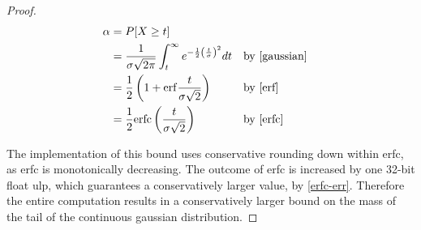 \documentclass{article}
\begin{document}
\begin{proof}
    \begin{align*}
        \alpha &= P[X \ge t] \\
        &= \frac{1}{\sigma \sqrt{2 \pi}} \int_{t}^{\infty} e^{-\frac{1}{2}\left( \frac{t}{\sigma}\right)^2} dt && \text{by } \ref{gaussian} \\
        &= \frac{1}{2} \left(1 + \mathrm{erf}\frac{t}{\sigma \sqrt{2}}\right) && \text{by } \ref{erf} \\
        &= \frac{1}{2} \mathrm{erfc}\left(\frac{t}{\sigma \sqrt{2}}\right) && \text{by } \ref{erfc}
    \end{align*}

    The implementation of this bound uses conservative rounding down within erfc, as erfc is monotonically decreasing.
    The outcome of erfc is increased by one 32-bit float ulp, which guarantees a conservatively larger value, by \ref{erfc-err}.
    Therefore the entire computation results in a conservatively larger bound on the mass of the tail of the continuous gaussian distribution.
\end{proof}
\end{document}
